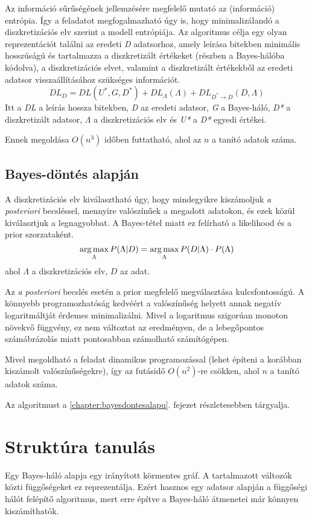 Az információ sűrűségének jellemzésére megfelelő mutató az (információ) entrópia. Így a feladatot megfogalmazható úgy is, hogy minimalizálandó a diszkretizációs elv szerint a modell entrópiája. Az algoritmus célja egy olyan reprezentációt találni az eredeti \emph{D} adatsorhoz, amely leírása bitekben minimális hosszúságú és tartalmazza a diszkretizált értékeket (részben a Bayes-hálóba kódolva), a diszkretizációs elvet, valamint a diszkretizált értékekből az eredeti adatsor visszaállításához szükséges információt.
$$ DL_{D} = DL(U^{*}, G, D^{*}) + DL_{\Lambda}(\Lambda) + DL_{D^{*} \rightarrow D}(D, \Lambda)$$
Itt a \emph{DL} a leírás hossza bitekben, \emph{D} az eredeti adatsor, \emph{G} a Bayes-háló, \emph{D*} a diszkretizált adatsor, \emph{$\Lambda$} a diszkretizációs elv és \emph{U*} a \emph{D*} egyedi értékei.

Ennek megoldása $O(n^3)$ időben futtatható, ahol az $n$ a tanító adatok száma.

\subsection{Bayes-döntés alapján}
A diszkretizációs elv kiválasztható úgy, hogy mindegyikre kiszámoljuk \textit{a posteriori} becsléssel, mennyire valószínűek a megadott adatokon, és ezek közül kiválasztjuk a legnagyobbat. A Bayes-tétel miatt ez felírható a likelihood és a prior szorzataként.
$$ \operatorname*{arg\,max}_{\Lambda}{P(\Lambda | D)} =
\operatorname*{arg\,max}_{\Lambda}{P(D | \Lambda) \cdot P(\Lambda)} $$
ahol $\Lambda$ a diszkretizációs elv, $D$ az adat.

Az \textit{a posteriori} becslés esetén a prior megfelelő megválasztása kulcsfontosságú. A könnyebb programozhatóság kedvéért a valószínűség helyett annak negatív logaritmáltját érdemes minimalizálni. Mivel a logaritmus szigorúan monoton növekvő függvény, ez nem változtat az eredményen, de a lebegőpontos számábrázolás miatt pontosabban számolható számítógépen.

Mivel megoldható a feladat dinamikus programozással (lehet építeni a korábban kiszámolt valószínűségekre), így az futásidő $O(n^2)$-re csökken, ahol $n$ a tanító adatok száma.

Az algoritmust a \ref{chapter:bayesdontesalapu}. fejezet részletesebben tárgyalja.

\section{Struktúra tanulás}
Egy Bayes-háló alapja egy irányított körmentes gráf. A tartalmazott változók közti függőségeket ez reprezentálja. Ezért hasznos egy adatsor alapján a függőségi hálót felépítő algoritmus, mert erre építve a Bayes-háló átmenetei már könnyen kiszámíthatók.


